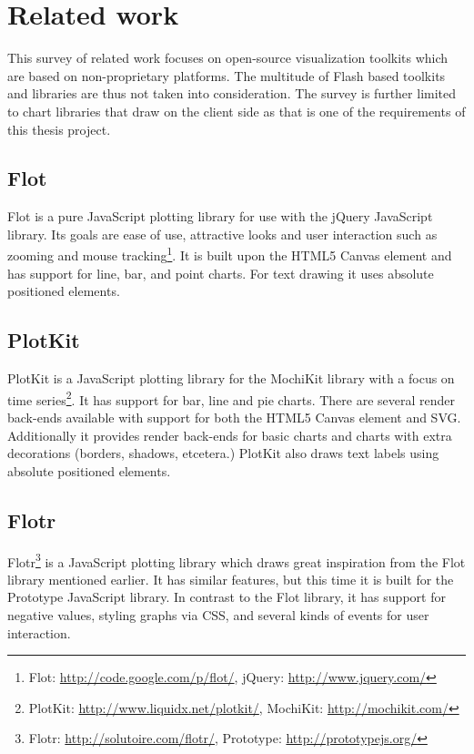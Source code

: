 \chapter{Related work}
This survey of related work focuses on open-source visualization toolkits which are based on non-proprietary platforms. The multitude of Flash based toolkits and libraries are thus not taken into consideration. The survey is further limited to chart libraries that draw on the client side as that is one of the requirements of this thesis project.

\section*{Flot}
Flot is a pure JavaScript plotting library for use with the jQuery JavaScript library. Its goals are ease of use, attractive looks and user interaction such as zooming and mouse tracking\footnote{Flot: \url{http://code.google.com/p/flot/}, jQuery: \url{http://www.jquery.com/}}. It is built upon the HTML5 Canvas element and has support for line, bar, and point charts. For text drawing it uses absolute positioned  elements. 

\section*{PlotKit}
PlotKit is a JavaScript plotting library for the MochiKit library with a focus on time series\footnote{PlotKit: \url{http://www.liquidx.net/plotkit/}, MochiKit: \url{http://mochikit.com/}}. It has support for bar, line and pie charts. There are several render back-ends available with support for both the HTML5 Canvas element and SVG. Additionally it provides render back-ends for basic charts and charts with extra decorations (borders, shadows, etcetera.) PlotKit also draws text labels using absolute positioned  elements.

\section*{Flotr}
Flotr\footnote{Flotr: \url{http://solutoire.com/flotr/}, Prototype: \url{http://prototypejs.org/}} is a JavaScript plotting library which draws great inspiration from the Flot library mentioned earlier. It has similar features, but this time it is built for the Prototype JavaScript library. In contrast to the Flot library, it has support for negative values, styling graphs via CSS, and several kinds of events for user interaction.

